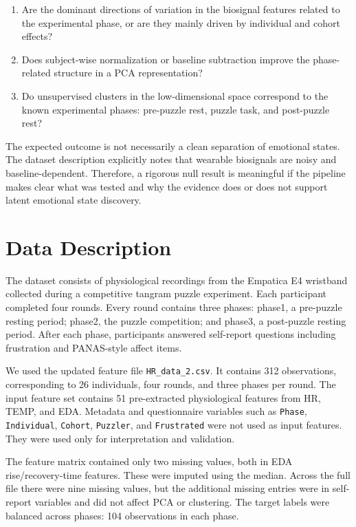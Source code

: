 \documentclass{article}
\begin{document}
\begin{enumerate}
    \item Are the dominant directions of variation in the biosignal features related to the experimental phase, or are they mainly driven by individual and cohort effects?
    \item Does subject-wise normalization or baseline subtraction improve the phase-related structure in a PCA representation?
    \item Do unsupervised clusters in the low-dimensional space correspond to the known experimental phases: pre-puzzle rest, puzzle task, and post-puzzle rest?
\end{enumerate}

The expected outcome is not necessarily a clean separation of emotional states. The dataset description explicitly notes that wearable biosignals are noisy and baseline-dependent. Therefore, a rigorous null result is meaningful if the pipeline makes clear what was tested and why the evidence does or does not support latent emotional state discovery.

\section*{Data Description}
The dataset consists of physiological recordings from the Empatica E4 wristband collected during a competitive tangram puzzle experiment. Each participant completed four rounds. Every round contains three phases: phase1, a pre-puzzle resting period; phase2, the puzzle competition; and phase3, a post-puzzle resting period. After each phase, participants answered self-report questions including frustration and PANAS-style affect items.

We used the updated feature file \texttt{HR\_data\_2.csv}. It contains 312 observations, corresponding to 26 individuals, four rounds, and three phases per round. The input feature set contains 51 pre-extracted physiological features from HR, TEMP, and EDA. Metadata and questionnaire variables such as \texttt{Phase}, \texttt{Individual}, \texttt{Cohort}, \texttt{Puzzler}, and \texttt{Frustrated} were not used as input features. They were used only for interpretation and validation.

The feature matrix contained only two missing values, both in EDA rise/recovery-time features. These were imputed using the median. Across the full file there were nine missing values, but the additional missing entries were in self-report variables and did not affect PCA or clustering. The target labels were balanced across phases: 104 observations in each phase.
\end{document}
